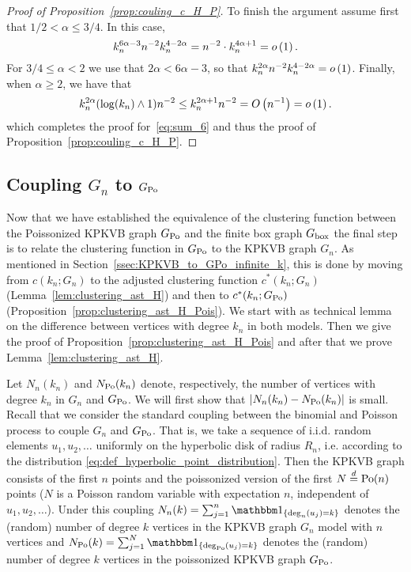 \begin{proof}[Proof of Proposition~\ref{prop:couling_c_H_P}]
To finish the argument assume first that $1/2 <\alpha \leq 3/4$. In this case,
\[
	k_n^{6\alpha -3}  n^{-2} k_n^{4 - 2\alpha} = 
	n^{-2} \cdot k_n^{4\alpha +1} = o\left(1\right).
\]
For $3/4 \le \alpha < 2$ we use that $2\alpha < 6\alpha - 3$, so that $k_n^{2\alpha} n^{-2} k_n^{4 - 2\alpha} = o\left(1\right)$. Finally, when $\alpha \geq 2$, we have that
\[
	k_n^{2\alpha} (\log(k_n) \wedge 1) n^{-2} \le k_n^{2\alpha + 1} n^{-2} = O\left(n^{-1}\right) = o\left(1\right).
\] 
which completes the proof for~\eqref{eq:sum_6} and thus the proof of Proposition~\ref{prop:couling_c_H_P}.
\end{proof}

\subsection{Coupling $G_n$ to $G_{\text{Po}}$}\label{ssec:coupling_H_HP}

Now that we have established the equivalence of the clustering function between the Poissonized KPKVB graph $G_{\text{Po}}$ and the finite box graph $G_{\text{box}}$ the final step is to relate the clustering function in $G_{\text{Po}}$ to the KPKVB graph $G_n$. As mentioned in Section~\ref{ssec:KPKVB_to_GPo_infinite_k}, this is done by moving from $c(k_n; G_n)$ to the adjusted clustering function $c^\ast(k_n; G_n)$ (Lemma~\ref{lem:clustering_ast_H}) and then to $c^\ast(k_n; G_{\text{Po}})$ (Proposition~\ref{prop:clustering_ast_H_Pois}). We start with as technical lemma on the difference between vertices with degree $k_n$ in both models. Then we give the proof of Proposition~\ref{prop:clustering_ast_H_Pois} and after that we prove  Lemma~\ref{lem:clustering_ast_H}.

Let $N_n(k_n)$ and $N_{{\mathrm{Po}}}(k_n)$ denote, respectively, the number of vertices with degree $k_n$ in $G_n$ and $G_{{\mathrm{Po}}}$. We will first show that $\left|N_{n}(k_n)-N_{{\mathrm{Po}}}(k_n)\right|$ is small. Recall that we consider the standard coupling between the binomial and Poisson process to couple $G_n$ and $G_{{\mathrm{Po}}}$. That is, we take a sequence of i.i.d. random elements $u_1, u_2, \dots$ uniformly on the hyperbolic disk of radius $R_n$, i.e. according to the distribution \eqref{eq:def_hyperbolic_point_distribution}. Then the KPKVB graph consists of the first $n$ points and the poissonized version of the first $N \stackrel{d}{=} {\mathrm{Po}}(n)$ points ($N$ is a Poisson random variable with expectation $n$, independent of $u_1, u_2, \dots$). Under this coupling $N_n(k) = \sum_{j=1}^n \ind{\mathrm{deg}_n(u_j)=k}$ denotes the (random) number of degree $k$ vertices in the KPKVB graph $G_n$ model with $n$ vertices and $N_{\Po}(k)=\sum_{j=1}^{N} \ind{\mathrm{deg}_{\Po}(u_j)=k}$ denotes the (random) number of degree $k$ vertices in the poissonized KPKVB graph $G_{\text{Po}}$.

